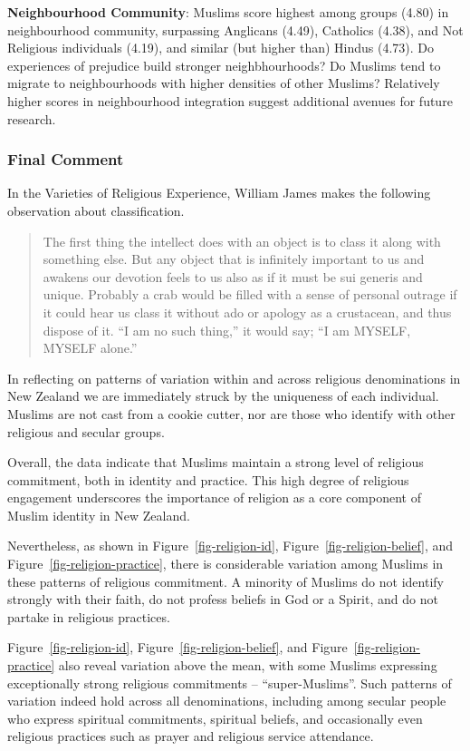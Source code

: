 \documentclass[
  single column]{article}
\begin{document}
\textbf{Neighbourhood Community}: Muslims score highest among groups
(4.80) in neighbourhood community, surpassing Anglicans (4.49),
Catholics (4.38), and Not Religious individuals (4.19), and similar (but
higher than) Hindus (4.73). Do experiences of prejudice build stronger
neighbhourhoods? Do Muslims tend to migrate to neighbourhoods with
higher densities of other Muslims? Relatively higher scores in
neighbourhood integration suggest additional avenues for future
research.

\subsubsection{Final Comment}\label{final-comment}

In the Varieties of Religious Experience, William James makes the
following observation about classification.

\begin{quote}
The first thing the intellect does with an object is to class it along
with something else. But any object that is infinitely important to us
and awakens our devotion feels to us also as if it must be sui generis
and unique. Probably a crab would be filled with a sense of personal
outrage if it could hear us class it without ado or apology as a
crustacean, and thus dispose of it. ``I am no such thing,'' it would
say; ``I am MYSELF, MYSELF alone.''
\end{quote}

In reflecting on patterns of variation within and across religious
denominations in New Zealand we are immediately struck by the uniqueness
of each individual. Muslims are not cast from a cookie cutter, nor are
those who identify with other religious and secular groups.

Overall, the data indicate that Muslims maintain a strong level of
religious commitment, both in identity and practice. This high degree of
religious engagement underscores the importance of religion as a core
component of Muslim identity in New Zealand.

Nevertheless, as shown in Figure~\ref{fig-religion-id},
Figure~\ref{fig-religion-belief}, and
Figure~\ref{fig-religion-practice}, there is considerable variation
among Muslims in these patterns of religious commitment. A minority of
Muslims do not identify strongly with their faith, do not profess
beliefs in God or a Spirit, and do not partake in religious practices.

Figure~\ref{fig-religion-id}, Figure~\ref{fig-religion-belief}, and
Figure~\ref{fig-religion-practice} also reveal variation above the mean,
with some Muslims expressing exceptionally strong religious commitments
-- ``super-Muslims''. Such patterns of variation indeed hold across all
denominations, including among secular people who express spiritual
commitments, spiritual beliefs, and occasionally even religious
practices such as prayer and religious service attendance.
\end{document}
